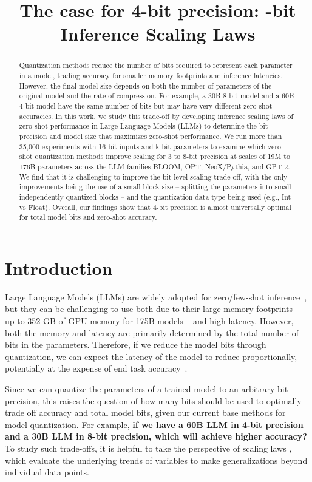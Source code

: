 \title{The case for 4-bit precision: -bit Inference Scaling Laws}

\begin{abstract}
Quantization methods reduce the number of bits required to represent each parameter in a model, trading accuracy for smaller memory footprints and inference latencies. However, the final model size depends on both the number of parameters of the original model and the rate of compression. For example, a 30B 8-bit model and a 60B 4-bit model have the same number of bits but may have very different zero-shot accuracies. In this work, we study this trade-off by developing inference scaling laws of zero-shot performance in Large Language Models (LLMs) to determine the bit-precision and model size that maximizes zero-shot performance. We run more than 35,000 experiments with 16-bit inputs and k-bit parameters to examine which zero-shot quantization methods improve scaling for 3 to 8-bit precision at scales of 19M to 176B parameters across the LLM families BLOOM, OPT, NeoX/Pythia, and GPT-2. We find that it is challenging to improve the bit-level scaling trade-off, with the only improvements being the use of a small block size -- splitting the parameters into small independently quantized blocks -- and the quantization data type being used (e.g., Int vs Float). Overall, our findings show that {4-bit} precision is almost universally optimal for total model bits and zero-shot accuracy.
\end{abstract}

\section{Introduction}

Large Language Models (LLMs) are widely adopted for zero/few-shot inference~\cite{zhang2022opt,black2022gpt,zeng2022glm,scao2022bloom}, but they can be challenging to use both due to their large memory footprints -- up to 352 GB of GPU memory for 175B models -- and high latency. However, both the memory and latency are primarily determined by the total number of bits in the parameters. Therefore, if we reduce the model bits through quantization, we can expect the latency of the model to reduce proportionally, potentially at the expense of end task accuracy~\citep{frantar2022gptq,park2022nuqmm,yao2022zeroquant}.

Since we can quantize the parameters of a trained model to an arbitrary bit-precision, this raises the question of how many bits should be used to optimally trade off accuracy and total model bits, given our current base methods for model quantization. For example, {\bf if we have a 60B LLM in 4-bit precision and a 30B LLM in 8-bit precision, which will achieve higher accuracy?} To study such trade-offs, it is helpful to take the perspective of scaling laws \citep{kaplan2020scaling,henighan2020scaling}, which evaluate the underlying trends of variables to make generalizations beyond individual data points.

